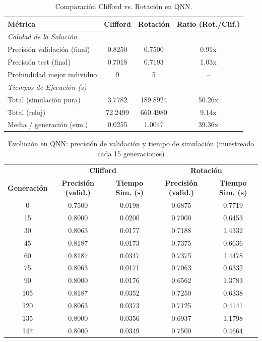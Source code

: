 \begin{table}[htbp]
\centering
\begin{tabular}{lccc}
\toprule
\textbf{Métrica} & \textbf{Clifford} & \textbf{Rotación} & \textbf{Ratio (Rot./Clif.)} \\
\midrule
\multicolumn{4}{l}{\textit{Calidad de la Solución}} \\
\midrule
Precisión validación (final) & 0.8250 & 0.7500 & 0.91x \\
Precisión test (final) & 0.7018 & 0.7193 & 1.03x \\
Profundidad mejor individuo & 9 & 5 & -- \\
\midrule
\multicolumn{4}{l}{\textit{Tiempos de Ejecución (s)}} \\
\midrule
Total (simulación pura) & 3.7782 & 189.8924 & 50.26x \\
Total (reloj) & 72.2499 & 660.4980 & 9.14x \\
Media / generación (sim.) & 0.0255 & 1.0047 & 39.36x \\
\bottomrule
\end{tabular}
\caption{Comparación Clifford vs. Rotación en QNN.}
\label{tab:comparison-qnn}
\end{table}

\begin{table}[htbp]
\centering
\begin{tabular}{c | cc | cc}
\toprule
& \multicolumn{2}{c|}{\textbf{Clifford}} & \multicolumn{2}{c}{\textbf{Rotación}} \\
\textbf{Generación} & \textbf{Precisión (valid.)} & \textbf{Tiempo Sim. (s)} & \textbf{Precisión (valid.)} & \textbf{Tiempo Sim. (s)} \\
\midrule
0 & 0.7500 & 0.0198 & 0.6875 & 0.7719 \\
15 & 0.8000 & 0.0200 & 0.7000 & 0.6453 \\
30 & 0.8063 & 0.0177 & 0.7188 & 1.4332 \\
45 & 0.8187 & 0.0173 & 0.7375 & 0.6636 \\
60 & 0.8187 & 0.0347 & 0.7375 & 1.4478 \\
75 & 0.8063 & 0.0171 & 0.7063 & 0.6332 \\
90 & 0.8000 & 0.0176 & 0.6562 & 1.3783 \\
105 & 0.8187 & 0.0352 & 0.7250 & 0.6338 \\
120 & 0.8063 & 0.0373 & 0.7125 & 0.4141 \\
135 & 0.8000 & 0.0356 & 0.6937 & 1.1798 \\
147 & 0.8000 & 0.0349 & 0.7500 & 0.4664 \\
\bottomrule
\end{tabular}
\caption{Evolución en QNN: precisión de validación y tiempo de simulación (muestreado cada 15 generaciones)}
\label{tab:history-qnn}
\end{table}
